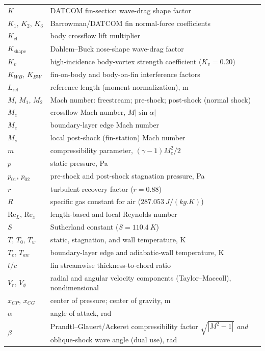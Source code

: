 \begin{longtable}{@{}l@{\hskip 2em}l@{}}
$K$ & DATCOM fin-section wave-drag shape factor \\
$K_1,\,K_2,\,K_3$ & Barrowman/DATCOM fin normal-force coefficients \\
$K_\mathrm{cf}$ & body crossflow lift multiplier \\
$K_\mathrm{shape}$ & Dahlem--Buck nose-shape wave-drag factor \\
$K_v$ & high-incidence body-vortex strength coefficient ($K_v = 0.20$) \\
$K_{WB},\,K_{BW}$ & fin-on-body and body-on-fin interference factors \\
$L_\mathrm{ref}$ & reference length (moment normalization), \si{\meter} \\
$M,\,M_1,\,M_2$ & Mach number: freestream; pre-shock; post-shock (normal shock) \\
$M_c$ & crossflow Mach number, $M\lvert\sin\alpha\rvert$ \\
$M_e$ & boundary-layer edge Mach number \\
$M_s$ & local post-shock (fin-station) Mach number \\
$m$ & compressibility parameter, $(\gamma-1)M_e^2/2$ \\
$p$ & static pressure, \si{\pascal} \\
$p_{01},\,p_{02}$ & pre-shock and post-shock stagnation pressure, \si{\pascal} \\
$r$ & turbulent recovery factor ($r=0.88$) \\
$R$ & specific gas constant for air ($\SI{287.053}{J/(kg.K)}$) \\
$\mathrm{Re}_L,\,\mathrm{Re}_x$ & length-based and local Reynolds number \\
$S$ & Sutherland constant ($S = \SI{110.4}{K}$) \\
$T,\,T_0,\,T_w$ & static, stagnation, and wall temperature, \si{\kelvin} \\
$T_e,\,T_{aw}$ & boundary-layer edge and adiabatic-wall temperature, \si{\kelvin} \\
$t/c$ & fin streamwise thickness-to-chord ratio \\
$V_r,\,V_\phi$ & radial and angular velocity components (Taylor--Maccoll), nondimensional \\
$x_{CP},\,x_{CG}$ & center of pressure; center of gravity, \si{\meter} \\
$\alpha$ & angle of attack, \si{\radian} \\
$\beta$ & Prandtl--Glauert/Ackeret compressibility factor $\sqrt{|M^2-1|}$ \emph{and} oblique-shock wave angle (dual use), \si{\radian} \\

\end{longtable}

